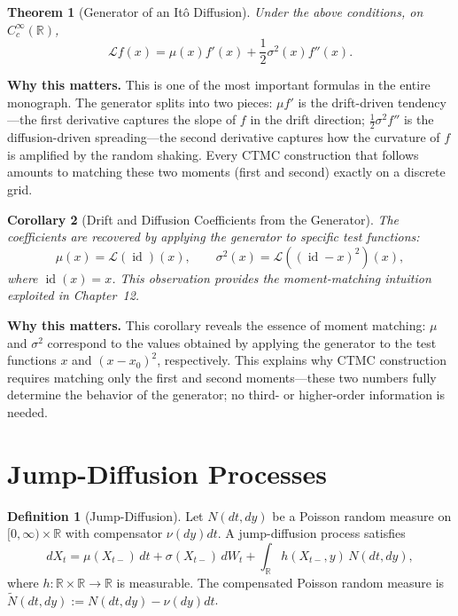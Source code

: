 \documentclass[11pt,a4paper,openany]{book}
\theoremstyle{definition}
\newtheorem{definition}{Definition}[chapter]
\theoremstyle{plain}
\newtheorem{theorem}{Theorem}[chapter]
\newtheorem{corollary}[theorem]{Corollary}
\theoremstyle{remark}
\DeclareMathOperator{\id}{id}
\newcommand{\1}{\mathbbm{1}}
\newcommand{\R}{\mathbb{R}}
\newcommand{\calL}{\mathcal{L}}
\begin{document}
\begin{theorem}[Generator of an It\^{o} Diffusion]
Under the above conditions, on $C_{c}^{\infty}(\R)$,
\[
\boxed{\calL f(x) = \mu(x) f'(x) + \frac{1}{2} \sigma^{2}(x) f''(x)}.
\]
\end{theorem}

\medskip
\noindent\textbf{Why this matters.} This is one of the most important formulas in the entire monograph. The generator splits into two pieces: $\mu f'$ is the drift-driven tendency---the first derivative captures the slope of $f$ in the drift direction; $\frac{1}{2}\sigma^2 f''$ is the diffusion-driven spreading---the second derivative captures how the curvature of $f$ is amplified by the random shaking. Every CTMC construction that follows amounts to matching these two moments (first and second) exactly on a discrete grid.

\begin{corollary}[Drift and Diffusion Coefficients from the Generator]
The coefficients are recovered by applying the generator to specific test functions:
\[
\mu(x) = \calL(\id)(x), \qquad \sigma^{2}(x) = \calL((\id - x)^{2})(x),
\]
where $\id(x) = x$. This observation provides the moment-matching intuition exploited in Chapter~12.
\end{corollary}

\medskip
\noindent\textbf{Why this matters.} This corollary reveals the essence of moment matching: $\mu$ and $\sigma^2$ correspond to the values obtained by applying the generator to the test functions $x$ and $(x - x_0)^2$, respectively. This explains why CTMC construction requires matching only the first and second moments---these two numbers fully determine the behavior of the generator; no third- or higher-order information is needed.

\section{Jump-Diffusion Processes}

\begin{definition}[Jump-Diffusion]
Let $N(dt, dy)$ be a Poisson random measure on $[0, \infty) \times \R$ with compensator $\nu(dy) dt$. A jump-diffusion process satisfies
\[
dX_{t} = \mu(X_{t-}) \, dt + \sigma(X_{t-}) \, dW_{t} + \int_{\R} h(X_{t-}, y) \, N(dt, dy),
\]
where $h: \R \times \R \to \R$ is measurable. The compensated Poisson random measure is $\widetilde{N}(dt, dy) := N(dt, dy) - \nu(dy) dt$.
\end{definition}
\end{document}
